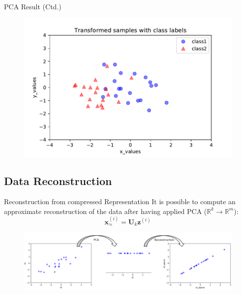 \begin{frame}{PCA Result (Ctd.)}{}
	\begin{figure}
		\centering
		\includegraphics[scale=0.6]{13_pca/02_img/pca_example_data_2d}
	\end{figure}
\end{frame}


\subsection{Data Reconstruction}

\begin{frame}{Reconstruction from compressed Representation}{}
	It is possible to compute an approximate reconstruction of the data after having applied PCA ($\mathbb{R}^k \rightarrow \mathbb{R}^m$):
	\begin{equation}
		\bm{x}_{\approx}^{(i)} = \bm{U}_k \bm{z}^{(i)}
	\end{equation}
	\begin{figure}
		\centering
		\includegraphics[scale=0.35]{13_pca/02_img/reconstruction}
	\end{figure}
\end{frame}


